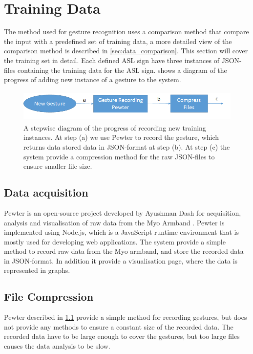 \section{Training Data}
\label{sec:traning_data}
The method used for gesture recognition uses a comparison method that compare the input with a predefined set of training data, a more detailed view of the comparison method is described in \cref{sec:data_comparison}. This section will cover the training set in detail. Each defined ASL sign have three instances of JSON-files containing the training data for the ASL sign.  shows a diagram of the progress of adding new instance of a gesture to the system.

\begin{figure}[!ht]
    \centering
    \includegraphics[height=1.6cm]{content/05-Methodology/images/step_creating_new_gesture.png}
    \caption[Training Data Diagram]{A stepwise diagram of the progress of recording new training instances. At step (a) we use Pewter to record the gesture, which returns data stored data in JSON-format at step (b). At step (c) the system provide a compression method for the raw JSON-files to ensure smaller file size.}
    \label{fig:training_data_diagram}
\end{figure}

\subsection{Data acquisition}
\label{subsec:data_acquisition}
Pewter is an open-source project developed by Ayushman Dash for acquisition, analysis and visualisation of raw data from the Myo Armband \cite{github:pewter}. Pewter is implemented using Node.js, which is a JavaScript runtime environment that is mostly used for developing web applications. The system provide a simple method to record raw data from the Myo armband, and store the recorded data in JSON-format. In addition it provide a visualisation page, where the data is represented in graphs.

\subsection{File Compression}
\label{subsec:file_compress}
Pewter described in \cref{subsec:data_acquisition} provide a simple method for recording gestures, but does not provide any methods to ensure a constant size of the recorded data. The recorded data have to be large enough to cover the gestures, but too large files causes the data analysis to be slow. 

